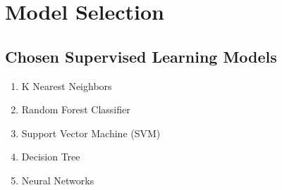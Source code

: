 \documentclass[a4paper,12pt]{report}
\begin{document}
\section{Model Selection}
\subsection{Chosen Supervised Learning Models}
\begin{enumerate}
    \item K Nearest Neighbors
    \item Random Forest Classifier
    \item Support Vector Machine (SVM)
    \item Decision Tree 
    \item Neural Networks
\end{enumerate}
\end{document}
